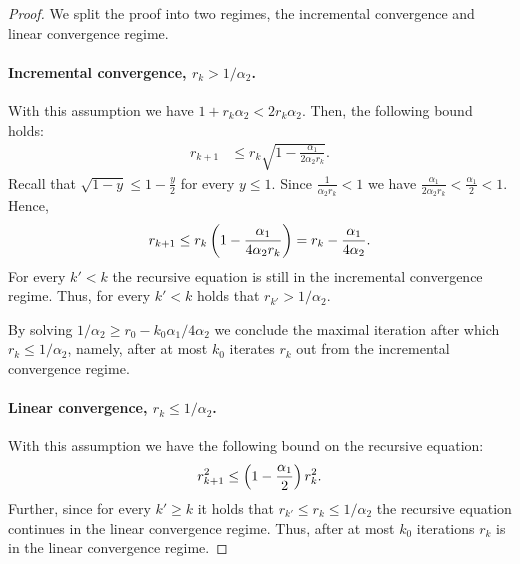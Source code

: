 \begin{proof}
We split the proof into two regimes, the incremental convergence and linear convergence regime.


\paragraph{Incremental convergence, $r_k> 1/\alpha_2$.} With this assumption we have $1+r_k \alpha_2 < 2 r_k \alpha_2$. Then, the following bound holds:
\begin{align*}
     r_{k+1} &\leq r_k\sqrt{1-\frac{\alpha_1}{2\alpha_2 r_k}}.
\end{align*}
Recall that $\sqrt{1-y}\leq 1-\frac{y}{2}$ for every $y \leq 1$. Since $ \frac{1}{\alpha_2 r_k}<  1$ we have $ \frac{\alpha_1}{2\alpha_2 r_k}<  \frac{\alpha_1}{2} < 1$.
Hence,
\begin{align*}
    r_{k+1} \leq r_k\left(1-\frac{\alpha_1}{4\alpha_2 r_k}\right) = r_k - \frac{\alpha_1}{4\alpha_2}.
\end{align*}
For every $k'<k$ the recursive equation is still in the incremental convergence regime. Thus, for every $k'<k$ holds that $r_{k'}> 1/\alpha_2$.

By solving $1/\alpha_2 \geq r_0 - k_0\alpha_1/4\alpha_2$ we conclude the maximal iteration after which $r_k\leq 1/\alpha_2$, namely, after at most $k_0$ iterates $r_k$ out from the incremental convergence regime.

\paragraph{Linear convergence, $r_k\leq 1/\alpha_2$.} With this assumption we have the following bound on the recursive equation:
 \begin{align*}
     r_{k+1}^2 \leq \left(1-\frac{\alpha_1}{2}\right)r_{k}^2.
 \end{align*}
Further, since for every $k'\geq k$ it holds that $r_{k'}\leq r_{k} \leq 1/\alpha_2 $ the recursive equation continues in the linear convergence regime. Thus, after at most $k_0$ iterations $r_k$ is in the linear convergence regime.

\end{proof}





